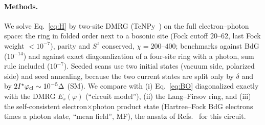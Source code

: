 \paragraph*{Methods.}
We solve Eq.~\eqref{eq:H} by two-site DMRG (TeNPy~\cite{TeNPy}) on the full electron--photon space: the
ring in folded order next to a bosonic site (Fock cutoff $20$--$62$, last Fock weight $<10^{-7}$), parity
and $S^z$ conserved, $\chi=200$--$400$; benchmarks against BdG ($10^{-14}$) and against exact diagonalization
of a four-site ring with a photon, sum rule included ($10^{-7}$). Seeded scans use two initial states
(vacuum side, polarized side) and seed annealing, because the two current states are split only by
$\delta$ and by $2I^\star\varphi_{\rm cl}\sim10^{-5}\Delta$ (SM). We compare with (i) Eq.~\eqref{eq:BO}
diagonalized exactly with the DMRG $E_s(\varphi)$ (``circuit model''), (ii) the Lang--Firsov ring, and
(iii) the self-consistent electron$\times$photon product state (Hartree--Fock BdG electrons times a photon
state, ``mean field'', MF), the ansatz of Refs.~\cite{Varrica2026,Andolina2020} for this circuit.
